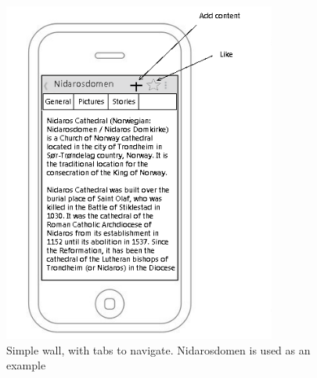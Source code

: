 \documentclass[11pt]{book}
\begin{document}
\begin{figure}[H]
      \centering
      \includegraphics[width=0.8\textwidth]{Figures/Phases/Sprint1/versiononeSimpleWall.png}
      \caption{Simple wall, with tabs to navigate. Nidarosdomen is used as an example}
      \label{fig:phases_sprint1_uiVersionOneSimpleWall}
\end{figure}
\end{document}
